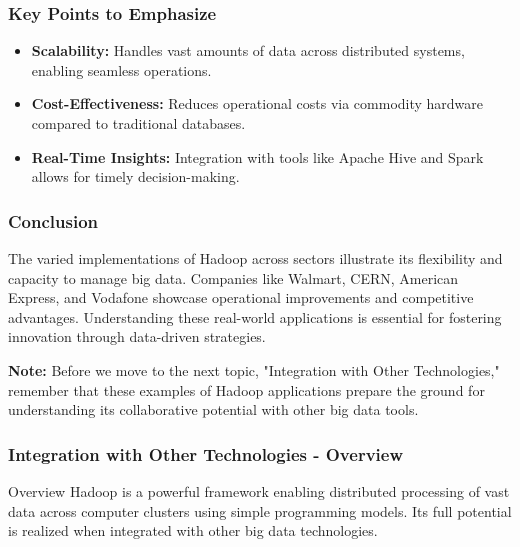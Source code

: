 \documentclass[aspectratio=169]{beamer}
\begin{document}
\begin{frame}[fragile]
    \frametitle{Key Points to Emphasize}
    \begin{itemize}
        \item \textbf{Scalability:} Handles vast amounts of data across distributed systems, enabling seamless operations.
        \item \textbf{Cost-Effectiveness:} Reduces operational costs via commodity hardware compared to traditional databases.
        \item \textbf{Real-Time Insights:} Integration with tools like Apache Hive and Spark allows for timely decision-making.
    \end{itemize}
\end{frame}

\begin{frame}[fragile]
    \frametitle{Conclusion}
    The varied implementations of Hadoop across sectors illustrate its flexibility and capacity to manage big data.
    Companies like Walmart, CERN, American Express, and Vodafone showcase operational improvements and competitive advantages.
    Understanding these real-world applications is essential for fostering innovation through data-driven strategies.
    
    \textbf{Note:} Before we move to the next topic, "Integration with Other Technologies," remember that these examples of Hadoop applications prepare the ground for understanding its collaborative potential with other big data tools.
\end{frame}

\begin{frame}[fragile]
    \frametitle{Integration with Other Technologies - Overview}
    \begin{block}{Overview}
        Hadoop is a powerful framework enabling distributed processing of vast data across computer clusters using simple programming models. Its full potential is realized when integrated with other big data technologies.
    \end{block}
\end{frame}
\end{document}
